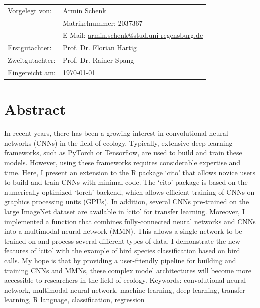 \documentclass[12pt,twoside]{scrreport}
\newcommand{\pkg}[1]{`#1'}
\begin{document}
\begin{titlepage}
\begin{tabular}{ll}
Vorgelegt von: & Armin Schenk \\
& Matrikelnummer: 2037367 \\
& E-Mail: \url{armin.schenk@stud.uni-regensburg.de} \vspace{5mm}\\

Erstgutachter: & Prof. Dr. Florian Hartig\\
Zweitgutachter: & Prof. Dr. Rainer Spang \vspace{5mm}\\

Eingereicht am: & \today\\
\end{tabular}
\restoregeometry 
\end{titlepage}

\thispagestyle{empty}
\vspace*{\fill} %
\mbox{} %

\chapter*{Abstract}
\noindent In recent years, there has been a growing interest in convolutional neural networks (CNNs) in the field of ecology. Typically, extensive deep learning frameworks, such as PyTorch or Tensorflow, are used to build and train these models. However, using these frameworks requires considerable expertise and time. Here, I present an extension to the R package \pkg{cito} that allows novice users to build and train CNNs with minimal code. The \pkg{cito} package is based on the numerically optimized \pkg{torch} backend, which allows efficient training of CNNs on graphics processing units (GPUs). In addition, several CNNs pre-trained on the large ImageNet dataset are available in \pkg{cito} for transfer learning. Moreover, I implemented a function that combines fully-connected neural networks and CNNs into a multimodal neural network (MMN). This allows a single network to be trained on and process several different types of data. I demonstrate the new features of \pkg{cito} with the example of bird species classification based on bird calls. My hope is that by providing a user-friendly pipeline for building and training CNNs and MMNs, these complex model architectures will become more accessible to researchers in the field of ecology.
\newline\newline
Keywords: convolutional neural network, multimodal neural network, machine learning, deep learning, transfer learning, R language, classification, regression
\vspace{3cm}
\end{document}
